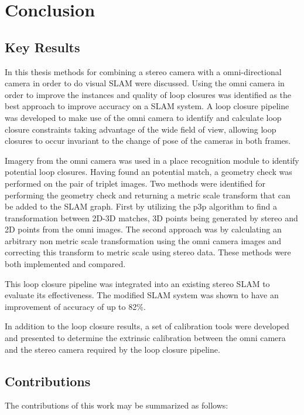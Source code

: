 \chapter{Conclusion}
\label{chapter:conclusion}

\section{Key Results}

In this thesis methods for combining a stereo camera with a omni-directional camera in order to do visual SLAM were discussed.  Using the omni camera in order to improve the instances and quality of loop closures was identified as the best approach to improve accuracy on a SLAM system.  A loop closure pipeline was developed to make use of the omni camera to identify and calculate loop closure constraints taking advantage of the wide field of view, allowing loop closures to occur invariant to the change of pose of the cameras in both frames.

Imagery from the omni camera was used in a place recognition module to identify potential loop closures.  Having found an potential match, a geometry check was performed on the pair of triplet images.  Two methods were identified for performing the geometry check and returning a metric scale transform that can be added to the SLAM graph. First by utilizing the p3p algorithm to find a transformation between 2D-3D matches, 3D points being generated by stereo and 2D points from the omni images.  The second approach was by calculating an arbitrary non metric scale transformation using the omni camera images and correcting this transform to metric scale using stereo data.  These methods were both implemented and compared.

This loop closure pipeline was integrated into an existing stereo SLAM to evaluate its effectiveness. The modified SLAM system was shown to have an improvement of accuracy of up to 82\%.

In addition to the loop closure results, a set of calibration tools were developed and presented to determine the extrinsic calibration between the omni camera and the stereo camera required by the loop closure pipeline.

\section{Contributions}

The contributions of this work may be summarized as follows:

